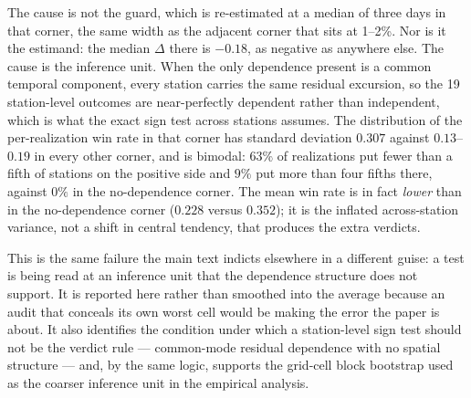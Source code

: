 \documentclass[11pt]{article}
\begin{document}
The cause is not the guard, which is re-estimated at a median of three days in that corner, the same
width as the adjacent corner that sits at 1--2\%. Nor is it the estimand: the median $\Delta$ there
is $-0.18$, as negative as anywhere else. The cause is the inference unit. When the only dependence
present is a common temporal component, every station carries the same residual excursion, so the 19
station-level outcomes are near-perfectly dependent rather than independent, which is what the exact
sign test across stations assumes. The distribution of the per-realization win rate in that corner has
standard deviation $0.307$ against $0.13$--$0.19$ in every other corner, and is bimodal: $63\%$ of
realizations put fewer than a fifth of stations on the positive side and $9\%$ put more than four
fifths there, against $0\%$ in the no-dependence corner. The mean win rate is in fact
\emph{lower} than in the no-dependence corner ($0.228$ versus $0.352$); it is the inflated
across-station variance, not a shift in central tendency, that produces the extra verdicts.

This is the same failure the main text indicts elsewhere in a different guise: a test is being read at
an inference unit that the dependence structure does not support. It is reported here rather than
smoothed into the average because an audit that conceals its own worst cell would be making the error
the paper is about. It also identifies the condition under which a station-level sign test should not
be the verdict rule --- common-mode residual dependence with no spatial structure --- and, by the same
logic, supports the grid-cell block bootstrap used as the coarser inference unit in the empirical
analysis.
\end{document}
